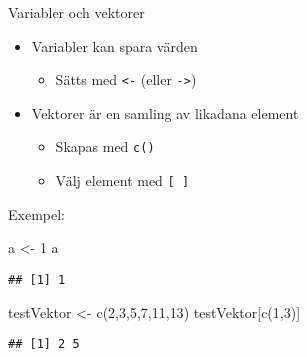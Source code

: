 \documentclass[
  10pt,
  ignorenonframetext,
]{beamer}
\newenvironment{Shaded}{\begin{snugshade}}{\end{snugshade}}
\newcommand{\DecValTok}[1]{\textcolor[rgb]{0.00,0.00,0.81}{#1}}
\newcommand{\FunctionTok}[1]{\textcolor[rgb]{0.00,0.00,0.00}{#1}}
\newcommand{\NormalTok}[1]{#1}
\newcommand{\OtherTok}[1]{\textcolor[rgb]{0.56,0.35,0.01}{#1}}
\providecommand{\tightlist}{%
  \setlength{\itemsep}{0pt}\setlength{\parskip}{0pt}}
\begin{document}
\begin{frame}[fragile]{Variabler och vektorer}
\protect\hypertarget{variabler-och-vektorer}{}
\begin{itemize}
\tightlist
\item
  Variabler kan spara värden

  \begin{itemize}
  \tightlist
  \item
    Sätts med \texttt{<-} (eller \texttt{->})
  \end{itemize}
\item
  Vektorer är en samling av likadana element

  \begin{itemize}
  \tightlist
  \item
    Skapas med \texttt{c()}
  \item
    Välj element med \texttt{[ ]}
  \end{itemize}
\end{itemize}

Exempel:

\begin{Shaded}
\begin{Highlighting}[]
\NormalTok{a }\OtherTok{\textless{}{-}} \DecValTok{1}
\NormalTok{a}
\end{Highlighting}
\end{Shaded}

\begin{verbatim}
## [1] 1
\end{verbatim}

\begin{Shaded}
\begin{Highlighting}[]
\NormalTok{testVektor }\OtherTok{\textless{}{-}} \FunctionTok{c}\NormalTok{(}\DecValTok{2}\NormalTok{,}\DecValTok{3}\NormalTok{,}\DecValTok{5}\NormalTok{,}\DecValTok{7}\NormalTok{,}\DecValTok{11}\NormalTok{,}\DecValTok{13}\NormalTok{)}
\NormalTok{testVektor[}\FunctionTok{c}\NormalTok{(}\DecValTok{1}\NormalTok{,}\DecValTok{3}\NormalTok{)]}
\end{Highlighting}
\end{Shaded}

\begin{verbatim}
## [1] 2 5
\end{verbatim}
\end{frame}
\end{document}
